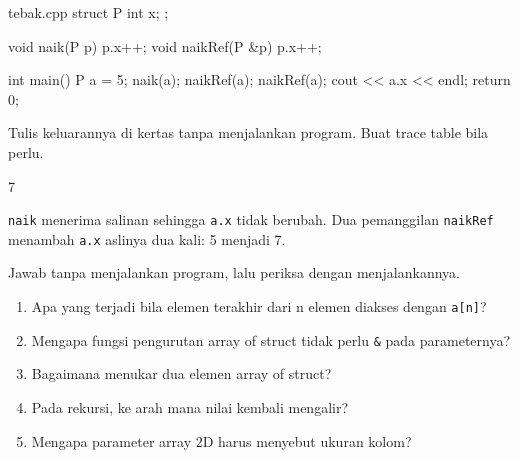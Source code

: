 \documentclass[a4paper]{article}
\begin{document}
\begin{MKode}{tebak.cpp}
struct P { int x; };

void naik(P p) { p.x++; }
void naikRef(P &p) { p.x++; }

int main() {
    P a = {5};
    naik(a);
    naikRef(a);
    naikRef(a);
    cout << a.x << endl;
    return 0;
}
\end{MKode}
\begin{Tebak}[]
Tulis keluarannya di kertas tanpa menjalankan program. Buat trace table bila perlu.
\end{Tebak}
\begin{Jawaban}[]
\begin{MKeluaran}[]
7
\end{MKeluaran}
\texttt{naik} menerima salinan sehingga \texttt{a.x} tidak berubah. Dua pemanggilan \texttt{naikRef} menambah \texttt{a.x} aslinya dua kali: 5 menjadi 7.
\end{Jawaban}
\par\vspace{4pt}\par\vspace{6pt}
Jawab tanpa menjalankan program, lalu periksa dengan menjalankannya.
\begin{enumerate}
\item Apa yang terjadi bila elemen terakhir dari n elemen diakses dengan \texttt{a[n]}?
\item Mengapa fungsi pengurutan array of struct tidak perlu \texttt{\&} pada parameternya?
\item Bagaimana menukar dua elemen array of struct?
\item Pada rekursi, ke arah mana nilai kembali mengalir?
\item Mengapa parameter array 2D harus menyebut ukuran kolom?
\end{enumerate}
\end{document}
